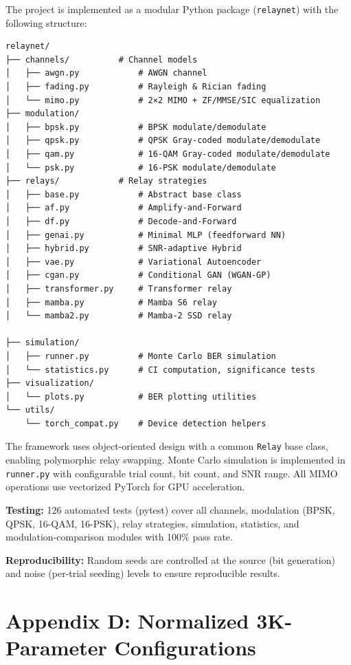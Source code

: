 The project is implemented as a modular Python package (\texttt{relaynet}) with the following structure:

\begin{verbatim}
relaynet/
├── channels/          # Channel models
│   ├── awgn.py            # AWGN channel
│   ├── fading.py          # Rayleigh & Rician fading
│   └── mimo.py            # 2×2 MIMO + ZF/MMSE/SIC equalization
├── modulation/
│   ├── bpsk.py            # BPSK modulate/demodulate
│   ├── qpsk.py            # QPSK Gray-coded modulate/demodulate
│   ├── qam.py             # 16-QAM Gray-coded modulate/demodulate
│   └── psk.py             # 16-PSK modulate/demodulate
├── relays/            # Relay strategies
│   ├── base.py            # Abstract base class
│   ├── af.py              # Amplify-and-Forward
│   ├── df.py              # Decode-and-Forward
│   ├── genai.py           # Minimal MLP (feedforward NN)
│   ├── hybrid.py          # SNR-adaptive Hybrid
│   ├── vae.py             # Variational Autoencoder
│   ├── cgan.py            # Conditional GAN (WGAN-GP)
│   ├── transformer.py     # Transformer relay
│   ├── mamba.py           # Mamba S6 relay
│   └── mamba2.py          # Mamba-2 SSD relay

├── simulation/
│   ├── runner.py          # Monte Carlo BER simulation
│   └── statistics.py      # CI computation, significance tests
├── visualization/
│   └── plots.py           # BER plotting utilities
└── utils/
    └── torch_compat.py    # Device detection helpers
\end{verbatim}

The framework uses object-oriented design with a common \texttt{Relay} base class, enabling polymorphic relay swapping. Monte Carlo simulation is implemented in \texttt{runner.py} with configurable trial count, bit count, and SNR range. All MIMO operations use vectorized PyTorch for GPU acceleration.

\textbf{Testing:} 126 automated tests (pytest) cover all channels, modulation (BPSK, QPSK, 16-QAM, 16-PSK), relay strategies, simulation, statistics, and modulation-comparison modules with 100\% pass rate.

\textbf{Reproducibility:} Random seeds are controlled at the source (bit generation) and noise (per-trial seeding) levels to ensure reproducible results.

\section{Appendix D: Normalized 3K-Parameter Configurations}\label{sec:appendix-d-normalized-3k-parameter-configurations}

